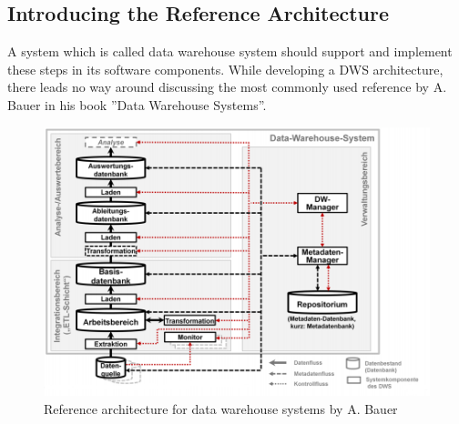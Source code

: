 \subsection{Introducing the Reference Architecture}
A system which is called data warehouse system should support and implement these steps in its software components. While developing a DWS architecture, there leads no way around discussing the most commonly used reference by A. Bauer in his book ''Data Warehouse Systems''.\cite{dwsRefArchitecture}\newline
\begin{figure}[htb]
    \centering
    \includegraphics[scale=0.45]{pictures/DataWarehouseReferenceArchitecture.png}
    \caption{Reference architecture for data warehouse systems by A. Bauer \cite[p.~42]{dwsRefArchitecture}}
    \label{fig:referenceArchitecture}
\end{figure} 

